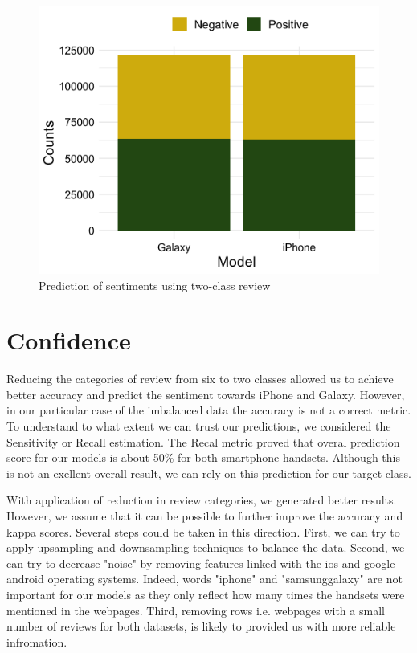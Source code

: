 \documentclass[12]{article}
\begin{document}
\begin{figure}[H]
\centering
\includegraphics[scale=0.5]{pred.png}
\centering
\caption{Prediction of sentiments using two-class review}
\label{fig:pred}
\end{figure}



\section{Confidence}
Reducing the categories of review from six to two classes allowed us to achieve better accuracy and predict the sentiment towards iPhone and Galaxy. However, in our particular case of the imbalanced data the accuracy is not a correct metric. To understand to what extent we can trust our predictions, we considered the Sensitivity or Recall estimation. The Recal metric proved that overal prediction score for our models is about 50\% for both smartphone handsets. Although this is not an exellent overall result, we can rely on this prediction for our target class. 

With application of reduction in review categories, we generated better results. However, we assume that it can be possible to further improve the accuracy and kappa scores. Several steps could be taken in this direction. First, we can try to apply upsampling and downsampling techniques to balance the data. Second, we can try to decrease "noise" by removing features linked with the ios and google android operating systems. Indeed, words "iphone" and "samsunggalaxy" are not important  for our models as they only reflect how many times the handsets were mentioned in the webpages. 
Third, removing rows i.e. webpages with a small number of reviews for both datasets, is likely to provided us with more reliable infromation.
\end{document}
